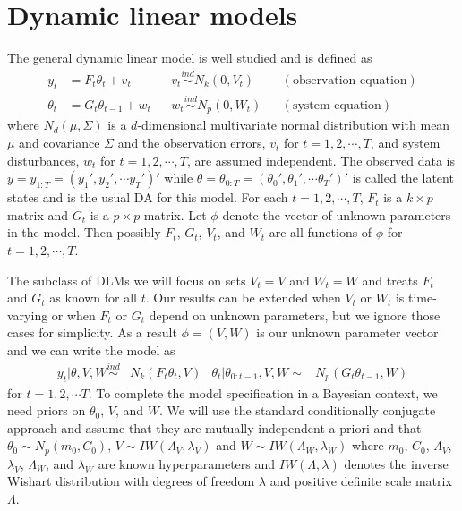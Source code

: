 \documentclass{article}
\begin{document}
\section{Dynamic linear models} \label{sec:DLM} 

The general dynamic linear model is well studied \cite{harrison1999bayesian,petris2009dynamic,prado2010time} and is defined as
\begin{align}
y_t &= F_t\theta_t + v_t && v_t \stackrel{ind}{\sim} N_k(0,V_t) && (\mbox{observation equation}) \label{dlmtdobseq}\\
 \theta_t &= G_t\theta_{t-1} + w_t && w_t \stackrel{ind}{\sim} N_p(0,W_t) && (\mbox{system equation}) \label{dlmtdsyseq}
\end{align}
where $N_d(\mu,\Sigma)$ is a $d$-dimensional multivariate normal distribution with mean $\mu$ and covariance $\Sigma$ and the observation errors, $v_{t}$ for $t=1,2,\cdots,T$, and system disturbances, $w_{t}$ for $t=1,2,\cdots,T$, are assumed independent. The observed data is $y=y_{1:T} = (y_1',y_2',\cdots y_T')'$ while $\theta=\theta_{0:T}=(\theta_0',\theta_1',\cdots \theta_T')'$ is called the latent states and is the usual DA for this model. For each $t=1,2,\cdots,T$, $F_t$ is a $k\times p$ matrix and $G_t$ is a $p\times p$ matrix. Let $\phi$ denote the vector of unknown parameters in the model. Then possibly $F_{t}$, $G_{t}$, $V_{t}$, and $W_{t}$ are all functions of $\phi$ for $t=1,2,\cdots,T$.

The subclass of DLMs we will focus on sets $V_t=V$ and $W_t=W$ and treats $F_{t}$ and $G_{t}$ as known for all $t$. Our results can be extended when $V_t$ or $W_t$ is time-varying or when $F_t$ or $G_t$ depend on unknown parameters, but we ignore those cases for simplicity. As a result $\phi=(V,W)$ is our unknown parameter vector and we can write the model as
\begin{align}
  y_t|\theta,V,W \stackrel{ind}{\sim} & N_k(F_t\theta_t,V) &
  \theta_t|\theta_{0:t-1},V,W  \sim & N_p(G_t\theta_{t-1},W) \label{dlmbotheqs}
\end{align}
for $t=1,2,\cdots T$. To complete the model specification in a Bayesian context, we need priors on $\theta_0$, $V$, and $W$. We will use the standard conditionally conjugate approach and assume that they are mutually independent a priori and that $\theta_0 \sim N_p(m_0, C_0)$, $V \sim IW(\Lambda_V, \lambda_V)$ and $W \sim IW(\Lambda_W, \lambda_W)$ where $m_0$, $C_0$, $\Lambda_V$, $\lambda_V$, $\Lambda_W$, and $\lambda_W$ are known hyperparameters and $IW(\Lambda, \lambda)$ denotes the inverse Wishart distribution with degrees of freedom $\lambda$ and positive definite scale matrix $\Lambda$. 
\end{document}
